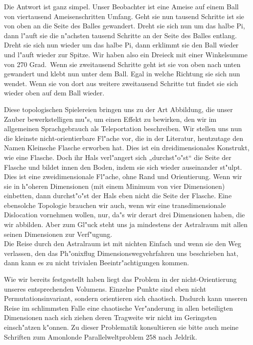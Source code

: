 \documentclass[a5paper,8pt]{book}
\begin{document}
Die Antwort ist ganz simpel. Unser Beobachter ist eine Ameise auf einem Ball von viertausend Ameisenschritten Umfang. Geht sie nun tausend Schritte ist sie von oben an die 
Seite des Balles gewandert. Dreht sie sich nun um das halbe Pi, dann l"auft sie die n"achsten tausend Schritte an der Seite des Balles entlang. Dreht sie sich nun wieder 
um das halbe Pi, dann erklimmt sie den Ball wieder und l"auft wieder zur Spitze. Wir haben also ein Dreieck mit einer Winkelsumme von 270 Grad.\
Wenn sie zweitausend Schritte geht ist sie von oben nach unten gewandert und klebt nun unter dem Ball. Egal in welche Richtung sie sich nun wendet. Wenn sie von dort aus 
weitere zweitausend Schritte tut findet sie sich wieder oben auf dem Ball wieder.\

Diese topologischen Spielereien bringen uns zu der Art Abbildung, die unser Zauber bewerkstelligen mu"s, um einen Effekt zu bewirken, den wir im allgemeinen Sprachgebrauch 
als Teleportation beschreiben. Wir stellen uns nun die kleinste nicht-orientierbare Fl"ache vor, die in der Literatur, heutzutage den Namen Kleinsche Flasche erworben hat.
Dies ist ein dreidimensionales Konstrukt, wie eine Flasche. Doch ihr Hals verl"angert sich „durchst"o"st“ die Seite der Flasche und bildet innen den Boden, indem sie sich 
wieder auseinander st"ulpt.
Dies ist eine zweidimensionale Fl"ache, ohne Rand und Orientierung. Wenn wir sie in h"oheren Dimensionen (mit einem Minimum von vier Dimensionen) einbetten, dann durchst"o"st 
der Hals eben nicht die Seite der Flasche.
Eine ebensolche Topologie brauchen wir auch, wenn wir eine transdimensionale Dislocation vornehmen wollen, nur, da"s wir derart drei Dimensionen haben, die wir abbilden. Aber 
zum Gl"uck steht uns ja mindestens der Astralraum mit allen seinen Dimensionen zur Verf"ugung.\\

Die Reise durch den Astralraum ist mit nichten Einfach und wenn sie den Weg verlassen, den das Ph"onixflug Dimensionswegvehrfahren uns beschrieben hat, dann kann es zu nicht 
trivialen Beeintr"achtigungen kommen.

Wie wir bereits festgestellt haben liegt das Problem in der nicht-Orientierung unseres entsprechenden Volumens. Einzelne Punkte sind eben nicht Permutationsinvariant, 
sondern orientieren sich chaotisch. Dadurch kann unseren Reise im schlimmsten Falle eine chaotische Ver"anderung in allen beteiligten Dimensionen nach sich ziehen deren 
Tragweite wir nicht im Geringsten einsch"atzen k"onnen.
Zu dieser Problematik konsultieren sie bitte auch meine Schriften zum Amonlonde Parallelweltproblem 258 nach Jeldrik.\\
\end{document}
